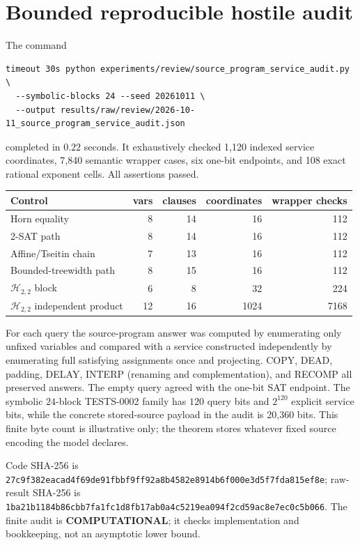 \documentclass[11pt]{article}
\newcommand{\status}[1]{\textbf{#1}}
\begin{document}
\section{Bounded reproducible hostile audit}
The command
\begin{verbatim}
timeout 30s python experiments/review/source_program_service_audit.py \
  --symbolic-blocks 24 --seed 20261011 \
  --output results/raw/review/2026-10-11_source_program_service_audit.json
\end{verbatim}
completed in $0.22$ seconds.  It exhaustively checked 1,120 indexed service
coordinates, 7,840 semantic wrapper cases, six one-bit endpoints, and 108
exact rational exponent cells.  All assertions passed.

\begin{center}
\begin{tabular}{@{}lrrrr@{}}
\toprule
Control & vars & clauses & coordinates & wrapper checks\\
\midrule
Horn equality & 8&14&16&112\\
2-SAT path & 8&14&16&112\\
Affine/Tseitin chain & 7&13&16&112\\
Bounded-treewidth path & 8&15&16&112\\
$\mathcal H_{2,2}$ block & 6&8&32&224\\
$\mathcal H_{2,2}$ independent product &12&16&1024&7168\\
\bottomrule
\end{tabular}
\end{center}

For each query the source-program answer was computed by enumerating only
unfixed variables and compared with a service constructed independently by
enumerating full satisfying assignments once and projecting.  COPY, DEAD,
padding, DELAY, INTERP (renaming and complementation), and RECOMP all preserved
answers.  The empty query agreed with the one-bit SAT endpoint.  The symbolic
$24$-block TESTS-0002 family has $120$ query bits and
$2^{120}$ explicit service bits, while the concrete stored-source payload in
the audit is 20,360 bits.  This finite byte count is illustrative only; the
theorem stores whatever fixed source encoding the model declares.

Code SHA-256 is
\nolinkurl{27c9f382eacad4f69de91fbbf9ff92a8b4582e8914b6f000e3d5f7fda815ef8e};
raw-result SHA-256 is
\nolinkurl{1ba21b1184b86cbb7fa1fc1d8fb17ab0a4c5219ea094f2cd59ac8e7ec0c5b066}.
The finite audit is \status{COMPUTATIONAL}; it checks implementation and
bookkeeping, not an asymptotic lower bound.
\end{document}
